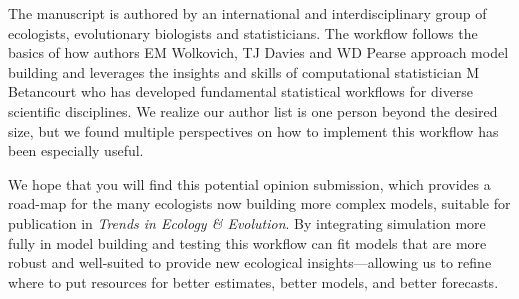 \documentclass[11pt]{article}
\begin{document}

The manuscript is authored by an international and interdisciplinary group of ecologists, evolutionary biologists and statisticians. The workflow follows the basics of how authors EM Wolkovich, TJ Davies and WD Pearse approach model building and leverages the insights and skills of computational statistician M Betancourt who has developed fundamental statistical workflows for diverse scientific disciplines. We realize our author list is one person beyond the desired size, but we found multiple perspectives on how to implement this workflow has been especially useful. %

We hope that you will find this potential opinion submission, which provides a road-map for the many ecologists now building more complex models, suitable for publication in \emph{Trends in Ecology \& Evolution}. By integrating simulation more fully in model building and testing this workflow can fit models that are more robust and well-suited to provide new ecological insights---allowing us to refine where to put resources for better estimates, better models, and better forecasts. %
\end{document}
